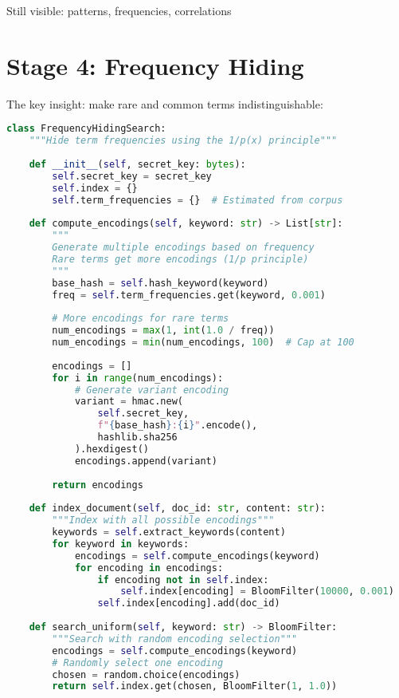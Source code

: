 Still visible: patterns, frequencies, correlations

\section{Stage 4: Frequency Hiding}

The key insight: make rare and common terms indistinguishable:

\begin{lstlisting}[language=Python, caption={Frequency hiding through multiple encodings}]
class FrequencyHidingSearch:
    """Hide term frequencies using the 1/p(x) principle"""
    
    def __init__(self, secret_key: bytes):
        self.secret_key = secret_key
        self.index = {}
        self.term_frequencies = {}  # Estimated from corpus
        
    def compute_encodings(self, keyword: str) -> List[str]:
        """
        Generate multiple encodings based on frequency
        Rare terms get more encodings (1/p principle)
        """
        base_hash = self.hash_keyword(keyword)
        freq = self.term_frequencies.get(keyword, 0.001)
        
        # More encodings for rare terms
        num_encodings = max(1, int(1.0 / freq))
        num_encodings = min(num_encodings, 100)  # Cap at 100
        
        encodings = []
        for i in range(num_encodings):
            # Generate variant encoding
            variant = hmac.new(
                self.secret_key,
                f"{base_hash}:{i}".encode(),
                hashlib.sha256
            ).hexdigest()
            encodings.append(variant)
        
        return encodings
    
    def index_document(self, doc_id: str, content: str):
        """Index with all possible encodings"""
        keywords = self.extract_keywords(content)
        for keyword in keywords:
            encodings = self.compute_encodings(keyword)
            for encoding in encodings:
                if encoding not in self.index:
                    self.index[encoding] = BloomFilter(10000, 0.001)
                self.index[encoding].add(doc_id)
    
    def search_uniform(self, keyword: str) -> BloomFilter:
        """Search with random encoding selection"""
        encodings = self.compute_encodings(keyword)
        # Randomly select one encoding
        chosen = random.choice(encodings)
        return self.index.get(chosen, BloomFilter(1, 1.0))
\end{lstlisting}

